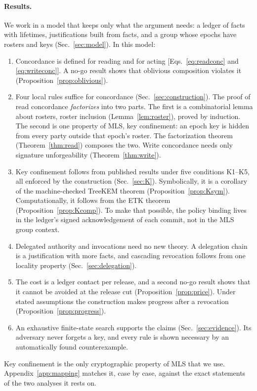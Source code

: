 \documentclass[aps,prx,reprint,superscriptaddress,nofootinbib,floatfix]{revtex4-2}
\theoremstyle{remark}
\begin{document}
\paragraph*{Results.} We work in a model that keeps only what the argument needs: a ledger of facts with lifetimes, justifications built from facts, and a group whose epochs have rosters and keys (Sec.~\ref{sec:model}). In this model:
\begin{enumerate}
\item Concordance is defined for reading and for acting [Eqs.~\eqref{eq:readconc} and \eqref{eq:writeconc}]. A no-go result shows that oblivious composition violates it (Proposition~\ref{prop:oblivious}).
\item Four local rules suffice for concordance (Sec.~\ref{sec:construction}). The proof of read concordance \emph{factorizes} into two parts. The first is a combinatorial lemma about rosters, roster inclusion (Lemma~\ref{lem:roster}), proved by induction. The second is one property of MLS, key confinement: an epoch key is hidden from every party outside that epoch's roster. The factorization theorem (Theorem~\ref{thm:read}) composes the two. Write concordance needs only signature unforgeability (Theorem~\ref{thm:write}).
\item Key confinement follows from published results under five conditions K1--K5, all enforced by the construction (Sec.~\ref{sec:K}). Symbolically, it is a corollary of the machine-checked TreeKEM theorem (Proposition~\ref{prop:Ksym}). Computationally, it follows from the ETK theorem (Proposition~\ref{prop:Kcomp}). To make that possible, the policy binding lives in the ledger's signed acknowledgement of each commit, not in the MLS group context.
\item Delegated authority and invocations need no new theory. A delegation chain is a justification with more facts, and cascading revocation follows from one locality property (Sec.~\ref{sec:delegation}).
\item The cost is a ledger contact per release, and a second no-go result shows that it cannot be avoided at the release cut (Proposition~\ref{prop:price}). Under stated assumptions the construction makes progress after a revocation (Proposition~\ref{prop:progress}).
\item An exhaustive finite-state search supports the claims (Sec.~\ref{sec:evidence}). Its adversary never forgets a key, and every rule is shown necessary by an automatically found counterexample.
\end{enumerate}
Key confinement is the only cryptographic property of MLS that we use. Appendix~\ref{app:mapping} matches it, case by case, against the exact statements of the two analyses it rests on.
\end{document}

